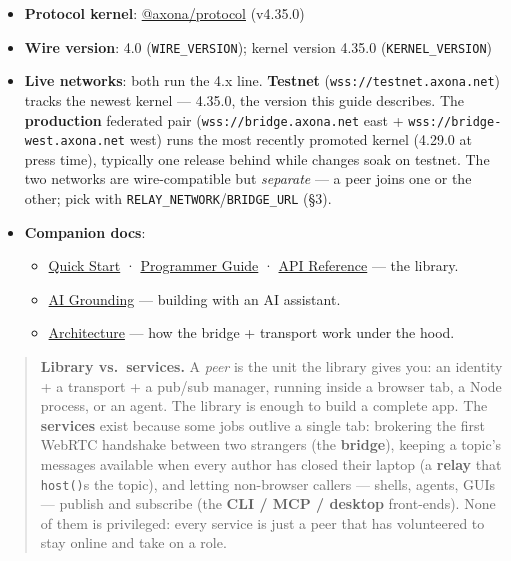 \documentclass[
  nobib]{tufte-handout}
\providecommand{\tightlist}{%
  \setlength{\itemsep}{0pt}\setlength{\parskip}{0pt}}
\begin{document}
\begin{itemize}
\tightlist
\item
  \textbf{Protocol kernel}:
  \href{https://github.com/axona-net/axona-protocol}{@axona/protocol}
  (v4.35.0)
\item
  \textbf{Wire version}: 4.0 (\texttt{WIRE\_VERSION}); kernel version
  4.35.0 (\texttt{KERNEL\_VERSION})
\item
  \textbf{Live networks}: both run the 4.x line. \textbf{Testnet}
  (\texttt{wss://testnet.axona.net}) tracks the newest kernel ---
  4.35.0, the version this guide describes. The \textbf{production}
  federated pair (\texttt{wss://bridge.axona.net} east +
  \texttt{wss://bridge-west.axona.net} west) runs the most recently
  promoted kernel (4.29.0 at press time), typically one release behind
  while changes soak on testnet. The two networks are wire-compatible
  but \emph{separate} --- a peer joins one or the other; pick with
  \texttt{RELAY\_NETWORK}/\texttt{BRIDGE\_URL} (§3).
\item
  \textbf{Companion docs}:

  \begin{itemize}
  \tightlist
  \item
    \href{Quick-Start-v4.27.1.md}{Quick Start} ·
    \href{Axona-Programmer-Guide-v4.27.1.md}{Programmer Guide} ·
    \href{Axona-API-Reference-v4.27.1.md}{API Reference} --- the
    library.
  \item
    \href{Axona-AI-Grounding-v4.27.1.md}{AI Grounding} --- building with
    an AI assistant.
  \item
    \href{../architecture/Axona-Architecture.tex}{Architecture} --- how
    the bridge + transport work under the hood.
  \end{itemize}
\end{itemize}

\begin{quote}
\textbf{Library vs.~services.} A \emph{peer} is the unit the library
gives you: an identity + a transport + a pub/sub manager, running inside
a browser tab, a Node process, or an agent. The library is enough to
build a complete app. The \textbf{services} exist because some jobs
outlive a single tab: brokering the first WebRTC handshake between two
strangers (the \textbf{bridge}), keeping a topic's messages available
when every author has closed their laptop (a \textbf{relay} that
\texttt{host()}s the topic), and letting non-browser callers --- shells,
agents, GUIs --- publish and subscribe (the \textbf{CLI / MCP / desktop}
front-ends). None of them is privileged: every service is just a peer
that has volunteered to stay online and take on a role.
\end{quote}
\end{document}
